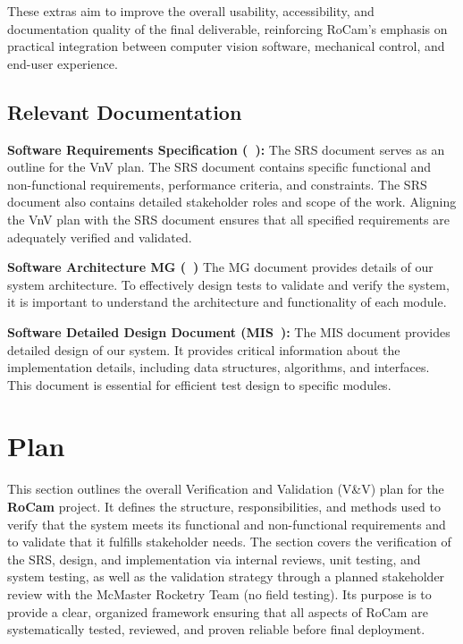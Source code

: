 \documentclass[12pt, titlepage]{article}
\begin{document}
These extras aim to improve the overall usability, accessibility, and
documentation quality of the final deliverable, reinforcing RoCam's emphasis on
practical integration between computer vision software, mechanical control, and
end-user experience.

\subsection{Relevant Documentation}

\textbf{Software Requirements Specification (\SRS~\cite{SRS}):}
The SRS document serves as an outline for the VnV plan. The SRS document
contains specific functional and non-functional requirements, performance
criteria, and constraints. The SRS document also contains detailed stakeholder
roles and scope of the work. Aligning the VnV plan with the SRS document ensures
that all specified requirements are adequately verified and validated.

\textbf{Software Architecture MG (\MG~\cite{MG}) }
The MG document provides details of our system architecture. To effectively design
tests to validate and verify the system, it is important to understand the
architecture and functionality of each module.

\textbf{Software Detailed Design Document (MIS~\cite{MIS}):}
The MIS document provides detailed design of our system. It provides critical information
about the implementation details, including data structures, algorithms, and interfaces.
This document is essential for efficient test design to specific modules.

\section{Plan}

This section outlines the overall Verification and Validation (V\&V) plan for
the \textbf{RoCam} project. It defines the structure, responsibilities, and
methods used to verify that the system meets its functional and non-functional
requirements and to validate that it fulfills stakeholder needs. The section
covers the verification of the SRS, design, and implementation via internal
reviews, unit testing, and system testing, as well as the validation strategy
through a planned stakeholder review with the McMaster Rocketry Team (no field
testing). Its purpose is to provide a clear, organized framework ensuring that
all aspects of RoCam are systematically tested, reviewed, and proven reliable
before final deployment.
\end{document}
